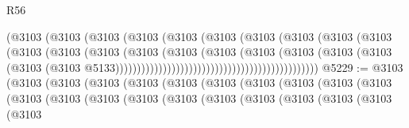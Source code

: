 \begin{lexlean}{R56}
\begin{coremodule}
{{{{{{{{{{{{{{{{{{{{{{{{{{{{{{{{{{{{{{{{{{{{{{{{{{{{{{{{{{{{{{{{{{{{{{{{{{{{{{{{{{{{{{{{{{{{{{{{{{{{{{{{{{{{{{{{{{{{{{{{{{{{{{{{{{{{{{{{{{{{{{{{{{{{{{{{{{{{{{{{{{{{{{{{{{{{{{{{{{{{{{{{{{{{{{{{{{{{{{{{{{{{{{{{{{{                                                      (@3103
                                                        (@3103
                                                          (@3103
                                                            (@3103
                                                              (@3103
                                                                (@3103
                                                                  (@3103
                                                                    (@3103
                                                                      (@3103
                                                                        (@3103
                                                                          (@3103
                                                                            (@3103
                                                                              (@3103
                                                                                (@3103
                                                                                  (@3103
                                                                                    (@3103
                                                                                      (@3103
                                                                                        (@3103
                                                                                          (@3103
                                                                                            (@3103
                                                                                              (@3103
                                                                                                (@3103
                                                                                                  @5133)))))))))))))))))))))))))))))))))))))))))))))))
@5229 := @3103
    (@3103
      (@3103
        (@3103
          (@3103
            (@3103
              (@3103
                (@3103
                  (@3103
                    (@3103
                      (@3103
                        (@3103
                          (@3103
                            (@3103
                              (@3103
                                (@3103
                                  (@3103
                                    (@3103
                                      (@3103
                                        (@3103
                                          (@3103
                                            (@3103
}}}}}}}}}}}}}}}}}}}}}}}}}}}}}}}}}}}}}}}}}}}}}}}}}}}}}}}}}}}}}}}}}}}}}}}}}}}}}}}}}}}}}}}}}}}}}}}}}}}}}}}}}}}}}}}}}}}}}}}}}}}}}}}}}}}}}}}}}}}}}}}}}}}}}}}}}}}}}}}}}}}}}}}}}}}}}}}}}}}}}}}}}}}}}}}}}}}}}}}}}}}}}}}}}}}
\end{coremodule}
\end{lexlean}
